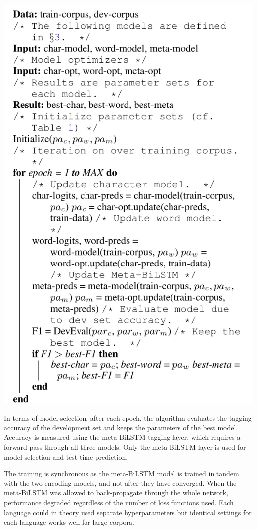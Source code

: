 \documentclass[11pt]{article}
\begin{document}
\begin{enumerate}
\begin{center}
\includegraphics[width=.9\linewidth]{assets/nnflAlg.png}
\end{center}

In terms of model selection, after each epoch, the algorithm evaluates the tagging accuracy of the development set and keeps the parameters of the best model. Accuracy is measured using the meta-BiLSTM tagging layer, which requires a forward pass through all three models. Only the meta-BiLSTM layer is used for model selection and test-time prediction.

The training is synchronous as the meta-BiLSTM model is trained in tandem with the two encoding models, and not after they have converged. When the meta-BiLSTM was allowed to back-propagate through the whole network, performance degraded regardless of the number of loss functions used. Each language could in theory used separate hyperparameters but identical settings for each language works well for large corpora.
\end{enumerate}
\end{document}
